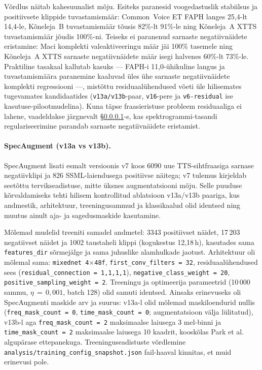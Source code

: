 Võrdlus näitab kahesuunalist mõju. Esiteks paranesid voogedastuslik stabiilsus ja positiivsete klippide tuvastamismäär: Common~Voice ET FAPH langes 25,4-lt 14,4-le, Kõneleja~B tuvastamismäär tõusis 82\%-lt 91\%-le ning Kõneleja~A XTTS tuvastamismäär jõudis 100\%-ni. Teiseks ei paranenud sarnaste negatiivnäidete eristamine: Maci komplekti valeaktiveeringu määr jäi 100\% tasemele ning Kõneleja~A XTTS sarnaste negatiivnäidete määr isegi halvenes 60\%-lt 73\%-le. Praktiline tasakaal kallutab kasuks --- FAPH-i 11,0-ühikuline langus ja tuvastamismäära paranemine kaaluvad üles ühe sarnaste negatiivnäidete komplekti regressiooni ---, mistõttu residuaalühendused võeti üle hilisemates tugevamates kandidaatides (\texttt{v13a/v13b}-paar, \texttt{v16}-pere ja \texttt{v6-residual} ise kasutuse-pilootmudelina). Kuna täpse fraasieristuse probleem residuaaliga ei lahene, vaadeldakse järgnevalt §\ref{sec:specaug-ablation}-s, kas spektrogrammi-tasandi regulariseerimine parandab sarnaste negatiivnäidete eristamist.

\paragraph{SpecAugment (v13a vs v13b).}
\label{sec:specaug-ablation}

SpecAugment lisati esmalt versioonis v7 koos 6090 uue TTS-sihtfraasiga sarnase negatiivklipi ja 826 SSML-laiendusega positiivse näitega; v7 tulemus kirjeldab seetõttu tervikseadistuse, mitte üksnes augmentatsiooni mõju. Selle puuduse kõrvaldamiseks tehti hilisem kontrollitud ablatsioon v13a/v13b paariga, kus andmestik, arhitektuur, treeningusammud ja klassikaalud olid identsed ning muutus ainult aja- ja sagedusmaskide kasutamine.

Mõlemad mudelid treeniti samadel andmetel: 3343 positiivset näidet, 17\,203 negatiivset näidet ja 1002 taustaheli klippi (kogukestus 12,18\,h), kasutades sama \texttt{features\_dir} sõrmejälge ja sama juhuslike alamhulkade jaotust. Arhitektuur oli mõlemal sama: \texttt{mixednet 4$\times$48f}, \texttt{first\_conv\_filters\,=\,32}, residuaalühendused sees (\texttt{residual\_connection\,=\,1,1,1,1}), \texttt{negative\_class\_weight\,=\,20}, \texttt{positive\_sampling\_weight\,=\,2}. Treeningu ja optimeerija parameetrid (10\,000 sammu, $\eta\,=\,0{,}001$, batch 128) olid samuti identsed. Ainsaks erinevuseks oli SpecAugmenti maskide arv ja suurus: v13a-l olid mõlemad maskiloendurid nullis (\texttt{freq\_mask\_count\,=\,0}, \texttt{time\_mask\_count\,=\,0}; augmentatsioon välja lülitatud), v13b-l aga \texttt{freq\_mask\_count\,=\,2} maksimaalse laiusega 3 mel-binni ja \texttt{time\_mask\_count\,=\,2} maksimaalse laiusega 10 kaadrit, kooskõlas Park et al. \cite{park2019specaugment} algupärase ettepanekuga. Treeninguseadistuste võrdlemine \texttt{analysis/training\_config\_snapshot.json} fail-haaval kinnitas, et muid erinevusi pole.

